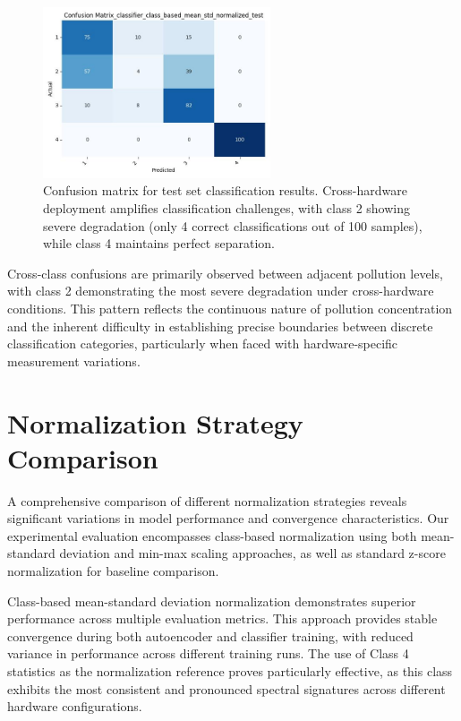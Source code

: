 \begin{figure}[H]
\centering
\includegraphics[width=0.6\textwidth]{out/class_based_mean_std_normalized/confusion_matrix_classifier_class_based_mean_std_normalized_test.jpg}
\caption{Confusion matrix for test set classification results. Cross-hardware deployment amplifies classification challenges, with class 2 showing severe degradation (only 4 correct classifications out of 100 samples), while class 4 maintains perfect separation.}
\label{fig:conf_matrix_test}
\end{figure}

Cross-class confusions are primarily observed between adjacent pollution levels, with class 2 demonstrating the most severe degradation under cross-hardware conditions. This pattern reflects the continuous nature of pollution concentration and the inherent difficulty in establishing precise boundaries between discrete classification categories, particularly when faced with hardware-specific measurement variations.

\section{Normalization Strategy Comparison}
\label{sec:normalization_comparison}

A comprehensive comparison of different normalization strategies reveals significant variations in model performance and convergence characteristics. Our experimental evaluation encompasses class-based normalization using both mean-standard deviation and min-max scaling approaches, as well as standard z-score normalization for baseline comparison.

Class-based mean-standard deviation normalization demonstrates superior performance across multiple evaluation metrics. This approach provides stable convergence during both autoencoder and classifier training, with reduced variance in performance across different training runs. The use of Class 4 statistics as the normalization reference proves particularly effective, as this class exhibits the most consistent and pronounced spectral signatures across different hardware configurations.


